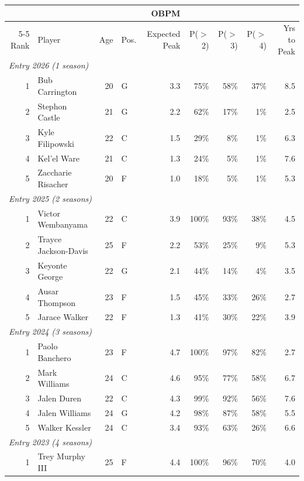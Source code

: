 \begin{table}[htbp]
  \centering\small
  \begin{tabular}{rlrlrrrrr}
    \toprule
     & & & & OBPM & & & & \\
    \cmidrule(lr){5-5}
    Rank & Player & Age & Pos. & Expected Peak & P($>$2) & P($>$3) & P($>$4) & Yrs to Peak \\
    \midrule
    \multicolumn{9}{l}{\textit{Entry 2026 (1 season)}} \\
    \midrule
    1 & Bub Carrington & 20 & G & 3.3 & 75\% & 58\% & 37\% & 8.5 \\
    2 & Stephon Castle & 21 & G & 2.2 & 62\% & 17\% & 1\% & 2.5 \\
    3 & Kyle Filipowski & 22 & C & 1.5 & 29\% & 8\% & 1\% & 6.3 \\
    4 & Kel'el Ware & 21 & C & 1.3 & 24\% & 5\% & 1\% & 7.6 \\
    5 & Zaccharie Risacher & 20 & F & 1.0 & 18\% & 5\% & 1\% & 5.3 \\
    \midrule[0.4pt]
    \multicolumn{9}{l}{\textit{Entry 2025 (2 seasons)}} \\
    \midrule
    1 & Victor Wembanyama & 22 & C & 3.9 & 100\% & 93\% & 38\% & 4.5 \\
    2 & Trayce Jackson-Davis & 25 & F & 2.2 & 53\% & 25\% & 9\% & 5.3 \\
    3 & Keyonte George & 22 & G & 2.1 & 44\% & 14\% & 4\% & 3.5 \\
    4 & Ausar Thompson & 23 & F & 1.5 & 45\% & 33\% & 26\% & 2.7 \\
    5 & Jarace Walker & 22 & F & 1.3 & 41\% & 30\% & 22\% & 3.9 \\
    \midrule[0.4pt]
    \multicolumn{9}{l}{\textit{Entry 2024 (3 seasons)}} \\
    \midrule
    1 & Paolo Banchero & 23 & F & 4.7 & 100\% & 97\% & 82\% & 2.7 \\
    2 & Mark Williams & 24 & C & 4.6 & 95\% & 77\% & 58\% & 6.7 \\
    3 & Jalen Duren & 22 & C & 4.3 & 99\% & 92\% & 56\% & 7.6 \\
    4 & Jalen Williams & 24 & G & 4.2 & 98\% & 87\% & 58\% & 5.5 \\
    5 & Walker Kessler & 24 & C & 3.4 & 93\% & 63\% & 26\% & 6.6 \\
    \midrule[0.4pt]
    \multicolumn{9}{l}{\textit{Entry 2023 (4 seasons)}} \\
    \midrule
    1 & Trey Murphy III & 25 & F & 4.4 & 100\% & 96\% & 70\% & 4.0 \\

\end{tabular}
\end{table}
